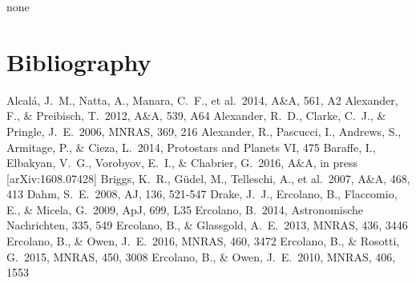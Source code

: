 \documentclass[10pt,fleqn,twoside]{article}
\newcommand*\aap{A\&A}
\newcommand*\aj{AJ}
\newcommand*\apjl{ApJ}
\newcommand*\mnras{MNRAS}
\begin{document}
none
\vspace{-2mm}

\section{Bibliography}
\vspace{-2mm}




\begingroup
\renewcommand{\section}[2]{}%
\begin{thebibliography}{}
 Alcal{\'a}, J.~M., Natta, A., Manara, C.~F., et al.\ 2014, \aap, 561, A2 
 Alexander, F., \& Preibisch, T.\ 2012, \aap, 539, A64
 Alexander, R.~D., Clarke, C.~J., \& Pringle, J.~E.\ 2006, \mnras, 369, 216 
 Alexander, R., Pascucci, I., Andrews, S., Armitage, P., \& Cieza, L.\ 2014, Protostars and Planets VI, 475
 Baraffe, I., Elbakyan, V.~G., Vorobyov, E.~I., \& Chabrier, G.\ 2016, \aap, in press [arXiv:1608.07428]
 Briggs, K.~R., G{\"u}del, M., Telleschi, A., et al.\ 2007, \aap, 468, 413 
 Dahm, S.~E.\ 2008, \aj, 136, 521-547 
 Drake, J.~J., Ercolano, B., Flaccomio, E., \& Micela, G.\ 2009, \apjl, 699, L35
 Ercolano, B.\ 2014, Astronomische Nachrichten, 335, 549
 Ercolano, B., \& Glassgold, A.~E.\ 2013, \mnras, 436, 3446 
 Ercolano, B., \& Owen, J.~E.\ 2016, \mnras, 460, 3472 
 Ercolano, B., \& Rosotti, G.\ 2015, \mnras, 450, 3008 
 Ercolano, B., \& Owen, J.~E.\ 2010, \mnras, 406, 1553

\end{thebibliography}
\end{document}
